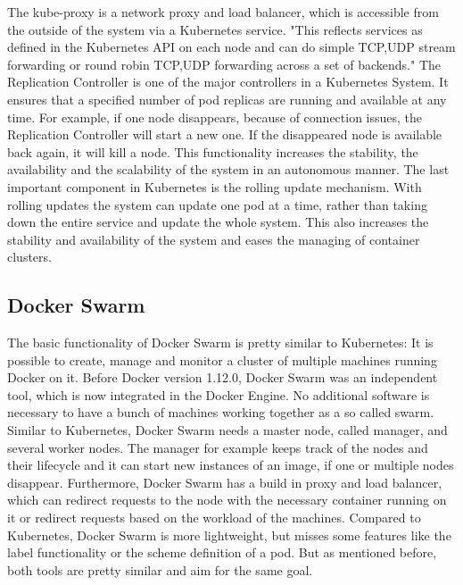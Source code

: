 The kube-proxy is a network proxy and load balancer, which is accessible from the outside of the system via a Kubernetes service.\autocite[cf.][p. 7]{Mulyana:2016}
"This reflects services as defined in the Kubernetes API on each node and can do simple TCP,UDP stream forwarding or round robin TCP,UDP forwarding across a set of backends."\autocite{Kubernetes:kube-proxy:2016}
The Replication Controller is one of the major controllers in a Kubernetes System.
It ensures that a specified number of pod replicas are running and available at any time.\autocite[cf.]{Kubernetes:replication-controller:2016}
For example, if one node disappears, because of connection issues, the Replication Controller will start a new one.
If the disappeared node is available back again, it will kill a node.
This functionality increases the stability, the availability and the scalability of the system in an autonomous manner.
The last important component in Kubernetes is the rolling update mechanism.
With rolling updates the system can update one pod at a time, rather than taking down the entire service and update the whole system.\autocite[cf.]{Kubernetes:rolling-updates:2016}
This also increases the stability and availability of the system and eases the managing of container clusters.

\subsection{Docker Swarm}
The basic functionality of Docker Swarm is pretty similar to Kubernetes: It is possible to create, manage and monitor a cluster of multiple machines running Docker on it.
Before Docker version 1.12.0, Docker Swarm was an independent tool, which is now integrated in the Docker Engine.\autocite[cf.]{dockerSwarm}
No additional software is necessary to have a bunch of machines working together as a so called swarm.
Similar to Kubernetes, Docker Swarm needs a master node, called manager, and several worker nodes.
The manager for example keeps track of the nodes and their lifecycle and it can start new instances of an image, if one or multiple nodes disappear.
Furthermore, Docker Swarm has a build in proxy and load balancer, which can redirect requests to the node with the necessary container running on it or redirect requests based on the workload of the machines.
Compared to Kubernetes, Docker Swarm is more lightweight, but misses some features like the label functionality or the scheme definition of a pod.
But as mentioned before, both tools are pretty similar and aim for the same goal.



